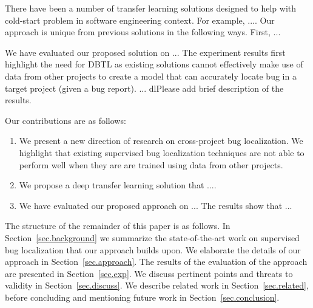 There have been a number of transfer learning solutions designed to help with cold-start problem in software engineering context. For example, .... Our approach is unique from previous solutions in the following ways. First, ... 

We have evaluated our proposed solution on ... The experiment results first highlight the need for DBTL as existing solutions cannot effectively make use of data from other projects to create a model that can accurately locate bug in a target project (given a bug report). ... dl{Please add brief description of the results.}

Our contributions are as follows:

\begin{enumerate}

\item We present a new direction of research on cross-project bug localization. We highlight that existing supervised bug localization techniques are not able to perform well when they are are trained using data from other projects. 
    
\item We propose a deep transfer learning solution that .... 

\item We have evaluated our proposed approach on ... The results show that ... 

\end{enumerate}

The structure of the remainder of this paper is as follows. In Section~\ref{sec.background} we summarize the state-of-the-art work on supervised bug localization that our approach builds upon. We elaborate the details of our approach in Section~\ref{sec.approach}. The results of the evaluation of the approach are presented in Section~\ref{sec.exp}. We discuss pertinent points and threats to validity in Section~\ref{sec.discuss}. We describe related work in Section~\ref{sec.related}, before concluding and mentioning future work in Section~\ref{sec.conclusion}. 